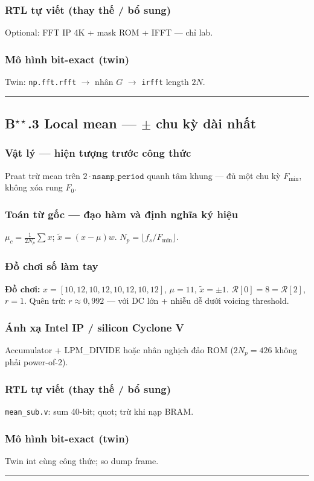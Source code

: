 \subsubsection*{RTL tự viết (thay thế / bổ sung)}
Optional: FFT IP 4K + mask ROM + IFFT --- chỉ lab.
\subsubsection*{Mô hình bit-exact (twin)}
Twin: \texttt{np.fft.rfft} $\to$ nhân $G$ $\to$ \texttt{irfft} length $2N$.
\vspace{0.4cm}\hrule\vspace{0.4cm}
\subsection*{B$^{\star\star}$.3 Local mean --- $\pm$ chu kỳ dài nhất}
\subsubsection*{Vật lý --- hiện tượng trước công thức}
Praat trừ mean trên $2\cdot\texttt{nsamp\_period}$ quanh tâm khung --- đủ một chu kỳ $F_{\min}$, không xóa rung $F_0$.
\subsubsection*{Toán từ gốc --- đạo hàm và định nghĩa ký hiệu}
$\mu_c=\frac{1}{2N_p}\sum x$; $\tilde x=(x-\mu)w$. $N_p=\lfloor f_s/F_{\min}\rfloor$.
\subsubsection*{Đồ chơi số làm tay}
\textbf{Đồ chơi:} $x=[10,12,10,12,10,12,10,12]$, $\mu=11$, $\tilde x=\pm1$. $\mathcal{R}[0]=8=\mathcal{R}[2]$, $r=1$. Quên trừ: $r\approx0{,}992$ --- với DC lớn + nhiễu dễ dưới voicing threshold.
\subsubsection*{Ánh xạ Intel IP / silicon Cyclone V}
Accumulator + LPM\_DIVIDE hoặc nhân nghịch đảo ROM ($2N_p=426$ không phải power-of-2).
\subsubsection*{RTL tự viết (thay thế / bổ sung)}
\texttt{mean\_sub.v}: sum 40-bit; quot; trừ khi nạp BRAM.
\subsubsection*{Mô hình bit-exact (twin)}
Twin int cùng công thức; so dump frame.
\vspace{0.4cm}\hrule\vspace{0.4cm}
